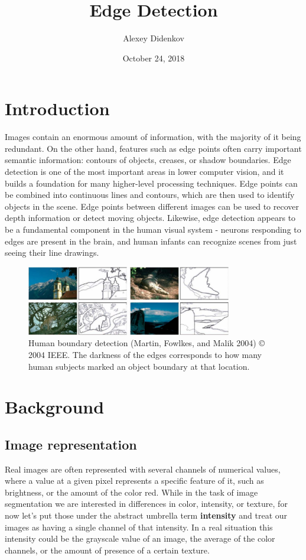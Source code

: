 \documentclass{article}
\title{Edge Detection}
\author{Alexey Didenkov}
\date{October 24, 2018}
\begin{document}
\maketitle

\section{Introduction}
Images contain an enormous amount of information, with the majority of it being redundant. On the other hand, features such as edge points often carry important semantic information: contours of objects, creases, or shadow boundaries. Edge detection is one of the most important areas in lower computer vision, and it builds a foundation for many higher-level processing techniques. Edge points can be combined into continuous lines and contours, which are then used to identify objects in the scene. Edge points between different images can be used to recover depth information or detect moving objects. Likewise, edge detection appears to be a fundamental component in the human visual system - neurons responding to edges are present in the brain, and human infants can recognize scenes from just seeing their line drawings. 
\begin{figure}[!htb]
    \begin{center}
        \includegraphics[width=0.8\textwidth]{Human_boundaries.png}
        \vspace{-10pt}
    \end{center}
    \caption{Human boundary detection (Martin, Fowlkes, and Malik 2004) © 2004 IEEE. The darkness of the edges corresponds to how many human subjects marked an object boundary at that location.}
\end{figure}

\section{Background}
\subsection{Image representation}
Real images are often represented with several channels of numerical values, where a value at a given pixel represents a specific feature of it, such as brightness, or the amount of the color red. While in the task of image segmentation we are interested in differences in color, intensity, or texture, for now let's put those under the abstract umbrella term \textbf{intensity} and treat our images as having a single channel of that intensity. In a real situation this intensity could be the grayscale value of an image, the average of the color channels, or the amount of presence of a certain texture.
\end{document}
